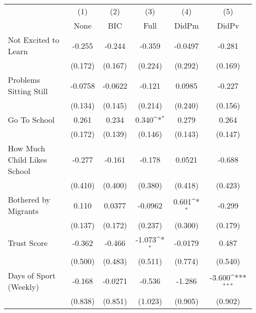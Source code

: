{
\def\sym#1{\ifmmode^{#1}\else\(^{#1}\)\fi}
\begin{tabular}{l*{5}{c}}
\toprule
            &\multicolumn{1}{c}{(1)}&\multicolumn{1}{c}{(2)}&\multicolumn{1}{c}{(3)}&\multicolumn{1}{c}{(4)}&\multicolumn{1}{c}{(5)}\\
            &\multicolumn{1}{c}{None}&\multicolumn{1}{c}{BIC}&\multicolumn{1}{c}{Full}&\multicolumn{1}{c}{DidPm}&\multicolumn{1}{c}{DidPv}\\
\midrule
Not Excited to Learn&      -0.255         &      -0.244         &      -0.359         &     -0.0497         &      -0.281         \\
            &     (0.172)         &     (0.167)         &     (0.224)         &     (0.292)         &     (0.169)         \\
\addlinespace
Problems Sitting Still&     -0.0758         &     -0.0622         &      -0.121         &      0.0985         &      -0.227         \\
            &     (0.134)         &     (0.145)         &     (0.214)         &     (0.240)         &     (0.156)         \\
\addlinespace
Go To School&       0.261         &       0.234         &       0.340\sym{*}  &       0.279         &       0.264         \\
            &     (0.172)         &     (0.139)         &     (0.146)         &     (0.143)         &     (0.147)         \\
\addlinespace
How Much Child Likes School&      -0.277         &      -0.161         &      -0.178         &      0.0521         &      -0.688         \\
            &     (0.410)         &     (0.400)         &     (0.380)         &     (0.418)         &     (0.423)         \\
\addlinespace
Bothered by Migrants&       0.110         &      0.0377         &     -0.0962         &       0.601\sym{*}  &      -0.299         \\
            &     (0.137)         &     (0.172)         &     (0.237)         &     (0.300)         &     (0.179)         \\
\addlinespace
Trust Score &      -0.362         &      -0.466         &      -1.073\sym{*}  &     -0.0179         &       0.487         \\
            &     (0.500)         &     (0.483)         &     (0.511)         &     (0.774)         &     (0.540)         \\
\addlinespace
Days of Sport (Weekly)&      -0.168         &     -0.0271         &      -0.536         &      -1.286         &      -3.600\sym{***}\\
            &     (0.838)         &     (0.851)         &     (1.023)         &     (0.905)         &     (0.902)         \\
\bottomrule
\end{tabular}
}
